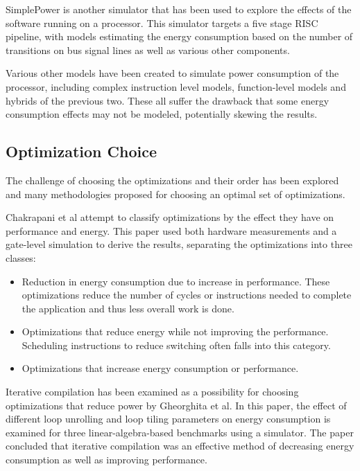 \documentclass[twocolumn]{article}
\begin{document}
SimplePower\cite{SimplePower} is another simulator that has been used to explore the effects of the software running on a processor. This simulator targets a five stage RISC pipeline, with models estimating the energy consumption based on the number of transitions on bus signal lines as well as various other components.

Various other models have been created to simulate power consumption of the processor, including complex instruction level models\cite{Steinke2001}, function-level models\cite{Qu2000} and hybrids of the previous two\cite{Blume2007}. These all suffer the drawback that some energy consumption effects may not be modeled, potentially skewing the results.


\subsection{Optimization Choice}

The challenge of choosing the optimizations and their order has been explored and many methodologies proposed for choosing an optimal set of optimizations.

Chakrapani et al attempt to classify optimizations by the effect they have on performance and energy\cite{WhatCanAPoorCompilerDo}. This paper used both hardware measurements and a gate-level simulation to derive the results, separating the optimizations into three classes:
\begin{itemize}
	\setlength{\itemsep}{0em}
	\vspace{-1mm}
	\item Reduction in energy consumption due to increase in performance. These optimizations reduce the number of cycles or instructions needed to complete the application and thus less overall work is done.
	\item Optimizations that reduce energy while not improving the performance. Scheduling instructions to reduce switching often falls into this category.
	\item Optimizations that increase energy consumption or performance.
\end{itemize}

Iterative compilation has been examined as a possibility for choosing optimizations that reduce power by Gheorghita et al\cite{IterativeCompilationForEnergy}. In this paper, the effect of different loop unrolling and loop tiling parameters on energy consumption is examined for three linear-algebra-based benchmarks using a simulator. The paper concluded that iterative compilation was an effective method of decreasing energy consumption as well as improving performance.
\end{document}
